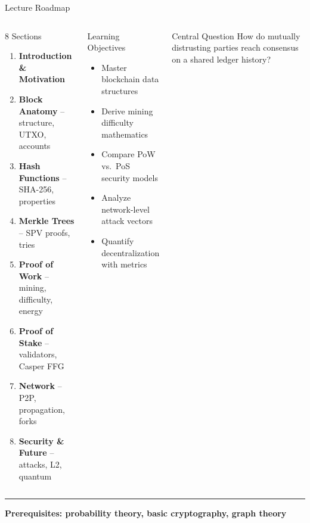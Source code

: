 \documentclass[8pt,aspectratio=169]{beamer}
\newcommand{\bottomnote}[1]{\vfill\vspace{-2mm}\textcolor{mllavender2}{\rule{\textwidth}{0.4pt}}\vspace{1mm}\footnotesize\textbf{#1}}
\begin{document}
\begin{frame}{Lecture Roadmap}
\begin{columns}
\begin{block}{8 Sections}
\begin{enumerate}\small
  \item \textcolor{mlpurple}{\textbf{Introduction \& Motivation}} \checkmark
  \item \textbf{Block Anatomy} -- structure, UTXO, accounts
  \item \textbf{Hash Functions} -- SHA-256, properties
  \item \textbf{Merkle Trees} -- SPV proofs, tries
  \item \textbf{Proof of Work} -- mining, difficulty, energy
  \item \textbf{Proof of Stake} -- validators, Casper FFG
  \item \textbf{Network} -- P2P, propagation, forks
  \item \textbf{Security \& Future} -- attacks, L2, quantum
\end{enumerate}
\end{block}
\begin{block}{Learning Objectives}
\begin{itemize}\small
  \item Master blockchain data structures
  \item Derive mining difficulty mathematics
  \item Compare PoW vs.\ PoS security models
  \item Analyze network-level attack vectors
  \item Quantify decentralization with metrics
\end{itemize}
\end{block}
\vspace{2mm}
\begin{alertblock}{Central Question}
\small How do mutually distrusting parties reach consensus on a shared ledger history?
\end{alertblock}
\end{columns}
\bottomnote{Prerequisites: probability theory, basic cryptography, graph theory}
\end{frame}
\end{document}
